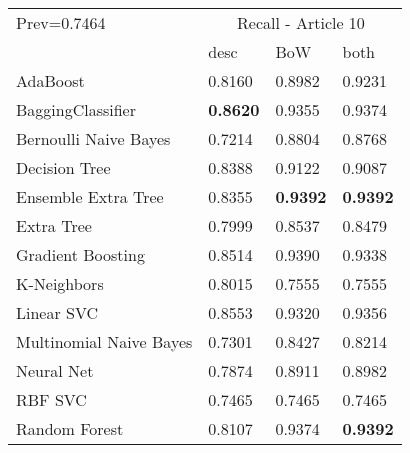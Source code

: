 \begin{tabular}{|l|l|l|l| }
\hline
Prev=0.7464 &  \multicolumn{3}{c|}{Recall - Article 10} \\
\cline{2-4} & desc & BoW & both \\ \hline
AdaBoost                & 0.8160 & 0.8982 & 0.9231\\
BaggingClassifier       & {\bf 0.8620} & 0.9355 & 0.9374\\
Bernoulli Naive Bayes   & 0.7214 & 0.8804 & 0.8768\\
Decision Tree           & 0.8388 & 0.9122 & 0.9087\\
Ensemble Extra Tree     & 0.8355 & {\bf 0.9392} & {\bf 0.9392}\\
Extra Tree              & 0.7999 & 0.8537 & 0.8479\\
Gradient Boosting       & 0.8514 & 0.9390 & 0.9338\\
K-Neighbors             & 0.8015 & 0.7555 & 0.7555\\
Linear SVC              & 0.8553 & 0.9320 & 0.9356\\
Multinomial Naive Bayes & 0.7301 & 0.8427 & 0.8214\\
Neural Net              & 0.7874 & 0.8911 & 0.8982\\
RBF SVC                 & 0.7465 & 0.7465 & 0.7465\\
Random Forest           & 0.8107 & 0.9374 & {\bf 0.9392}\\
\hline
\end{tabular}